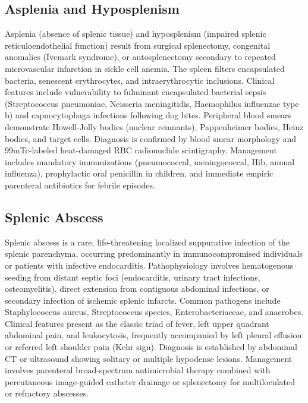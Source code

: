 \subsection{Asplenia and Hyposplenism}
\label{sec:Asplenia and Hyposplenism}
Asplenia (absence of splenic tissue) and hyposplenism (impaired splenic reticuloendothelial function) result from surgical splenectomy, congenital anomalies (Ivemark syndrome), or autosplenectomy secondary to repeated microvascular infarction in sickle cell anemia. The spleen filters encapsulated bacteria, senescent erythrocytes, and intraerythrocytic inclusions. Clinical features include vulnerability to fulminant encapsulated bacterial sepsis (Streptococcus pneumoniae, Neisseria meningitidis, Haemophilus influenzae type b) and capnocytophaga infections following dog bites. Peripheral blood smears demonstrate Howell-Jolly bodies (nuclear remnants), Pappenheimer bodies, Heinz bodies, and target cells. Diagnosis is confirmed by blood smear morphology and 99mTc-labeled heat-damaged RBC radionuclide scintigraphy. Management includes mandatory immunizations (pneumococcal, meningococcal, Hib, annual influenza), prophylactic oral penicillin in children, and immediate empiric parenteral antibiotics for febrile episodes.

\subsection{Splenic Abscess}
\label{sec:Splenic Abscess}
Splenic abscess is a rare, life-threatening localized suppurative infection of the splenic parenchyma, occurring predominantly in immunocompromised individuals or patients with infective endocarditis. Pathophysiology involves hematogenous seeding from distant septic foci (endocarditis, urinary tract infections, osteomyelitis), direct extension from contiguous abdominal infections, or secondary infection of ischemic splenic infarcts. Common pathogens include Staphylococcus aureus, Streptococcus species, Enterobacteriaceae, and anaerobes. Clinical features present as the classic triad of fever, left upper quadrant abdominal pain, and leukocytosis, frequently accompanied by left pleural effusion or referred left shoulder pain (Kehr sign). Diagnosis is established by abdominal CT or ultrasound showing solitary or multiple hypodense lesions. Management involves parenteral broad-spectrum antimicrobial therapy combined with percutaneous image-guided catheter drainage or splenectomy for multiloculated or refractory abscesses.

